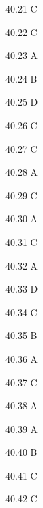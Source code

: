 \begin{Solution}{40.{21}}
C
\end{Solution}
\begin{Solution}{40.{22}}
C
\end{Solution}
\begin{Solution}{40.{23}}
A
\end{Solution}
\begin{Solution}{40.{24}}
B
\end{Solution}
\begin{Solution}{40.{25}}
D
\end{Solution}
\begin{Solution}{40.{26}}
C
\end{Solution}
\begin{Solution}{40.{27}}
C
\end{Solution}
\begin{Solution}{40.{28}}
A
\end{Solution}
\begin{Solution}{40.{29}}
C
\end{Solution}
\begin{Solution}{40.{30}}
A
\end{Solution}
\begin{Solution}{40.{31}}
C
\end{Solution}
\begin{Solution}{40.{32}}
A
\end{Solution}
\begin{Solution}{40.{33}}
D
\end{Solution}
\begin{Solution}{40.{34}}
C
\end{Solution}
\begin{Solution}{40.{35}}
B
\end{Solution}
\begin{Solution}{40.{36}}
A
\end{Solution}
\begin{Solution}{40.{37}}
C
\end{Solution}
\begin{Solution}{40.{38}}
A
\end{Solution}
\begin{Solution}{40.{39}}
A
\end{Solution}
\begin{Solution}{40.{40}}
B
\end{Solution}
\begin{Solution}{40.{41}}
C
\end{Solution}
\begin{Solution}{40.{42}}
C
\end{Solution}
